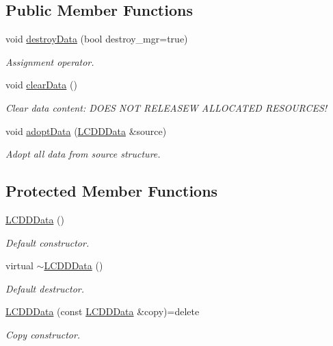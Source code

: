 \subsection*{Public Member Functions}
\begin{DoxyCompactItemize}
\item 
void \hyperlink{class_d_d4hep_1_1_geometry_1_1_l_c_d_d_data_a8c54de26155fec96a884f912f9c7a0ee}{destroy\+Data} (bool destroy\+\_\+mgr=true)
\begin{DoxyCompactList}\small\item\em Assignment operator. \end{DoxyCompactList}\item 
void \hyperlink{class_d_d4hep_1_1_geometry_1_1_l_c_d_d_data_a6c9bd1b309c7cb21dea26dc6c1504716}{clear\+Data} ()
\begin{DoxyCompactList}\small\item\em Clear data content\+: D\+O\+ES N\+OT R\+E\+L\+E\+A\+S\+EW A\+L\+L\+O\+C\+A\+T\+ED R\+E\+S\+O\+U\+R\+C\+E\+S! \end{DoxyCompactList}\item 
void \hyperlink{class_d_d4hep_1_1_geometry_1_1_l_c_d_d_data_a2f2797cec01fb1e6e6c6e762c9ffc170}{adopt\+Data} (\hyperlink{class_d_d4hep_1_1_geometry_1_1_l_c_d_d_data}{L\+C\+D\+D\+Data} \&source)
\begin{DoxyCompactList}\small\item\em Adopt all data from source structure. \end{DoxyCompactList}\end{DoxyCompactItemize}
\subsection*{Protected Member Functions}
\begin{DoxyCompactItemize}
\item 
\hyperlink{class_d_d4hep_1_1_geometry_1_1_l_c_d_d_data_a708e690646050f36f621ac61052b07cd}{L\+C\+D\+D\+Data} ()
\begin{DoxyCompactList}\small\item\em Default constructor. \end{DoxyCompactList}\item 
virtual \hyperlink{class_d_d4hep_1_1_geometry_1_1_l_c_d_d_data_ac0b2ce6ff949288f48cdffc399f21808}{$\sim$\+L\+C\+D\+D\+Data} ()
\begin{DoxyCompactList}\small\item\em Default destructor. \end{DoxyCompactList}\item 
\hyperlink{class_d_d4hep_1_1_geometry_1_1_l_c_d_d_data_ad4bb0b37126711f802a94b6772703031}{L\+C\+D\+D\+Data} (const \hyperlink{class_d_d4hep_1_1_geometry_1_1_l_c_d_d_data}{L\+C\+D\+D\+Data} \&copy)=delete
\begin{DoxyCompactList}\small\item\em Copy constructor. \end{DoxyCompactList}\end{DoxyCompactItemize}
